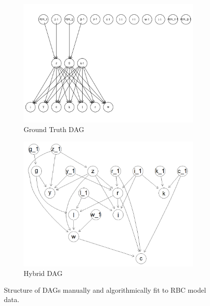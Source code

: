 \documentclass{article}
\begin{document}
\begin{figure}

  \centering
  \begin{subfigure}{0.6\textwidth}
    \centering
    \includegraphics[width=\linewidth]{images/rbc_true_dag.png} 
    \caption{Ground Truth DAG}
    \label{gtdag}
  \end{subfigure}
  \begin{subfigure}{0.6\textwidth}
    \centering  
    \includegraphics[width=\linewidth]{images/rbc_hybrid_structure.png}
    \caption{Hybrid DAG}
    \label{hdag}
  \end{subfigure}

  \caption{Structure of DAGs manually and algorithmically fit to RBC model data.}
  \label{rbcdags}
\end{figure}
\end{document}
